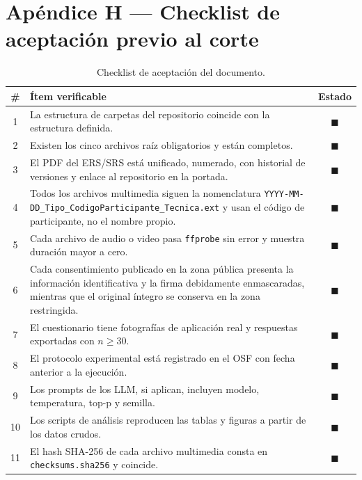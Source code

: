 \documentclass[journal,onecolumn]{IEEEtran}
\begin{document}
	\section*{Apéndice H --- Checklist de aceptación previo al corte}
	\label{ap:checklist}
	
	\begin{table}[H]
		\centering
	\caption{Checklist de aceptación del documento.}
		\label{tab:checklist}
		\small
		\begin{tabularx}{\textwidth}{@{}c X c@{}}
			\toprule
			\textbf{\#} & \textbf{Ítem verificable} & \textbf{Estado} \\
			\midrule
			1 & La estructura de carpetas del repositorio coincide con la estructura definida. & $\blacksquare$ \\
			2 & Existen los cinco archivos raíz obligatorios y están completos. & $\blacksquare$ \\
			3 & El PDF del ERS/SRS está unificado, numerado, con historial de versiones y enlace al repositorio en la portada. & $\blacksquare$ \\
			4 & Todos los archivos multimedia siguen la nomenclatura \texttt{YYYY-MM-DD\_Tipo\_CodigoParticipante\_Tecnica.ext} y usan el código de participante, no el nombre propio. & $\blacksquare$ \\
			5 & Cada archivo de audio o video pasa \texttt{ffprobe} sin error y muestra duración mayor a cero. & $\blacksquare$ \\
			6 & Cada consentimiento publicado en la zona pública presenta la información identificativa y la firma debidamente enmascaradas, mientras que el original íntegro se conserva en la zona restringida. & $\blacksquare$ \\
			7 & El cuestionario tiene fotografías de aplicación real y respuestas exportadas con $n \geq 30$. & $\blacksquare$ \\
			8 & El protocolo experimental está registrado en el OSF con fecha anterior a la ejecución. & $\blacksquare$ \\
			9 & Los prompts de los LLM, si aplican, incluyen modelo, temperatura, top-p y semilla. & $\blacksquare$ \\
			10 & Los scripts de análisis reproducen las tablas y figuras a partir de los datos crudos. & $\blacksquare$ \\
			11 & El hash SHA-256 de cada archivo multimedia consta en \texttt{checksums.sha256} y coincide. & $\blacksquare$\\

\end{tabularx}
\end{table}
\end{document}
